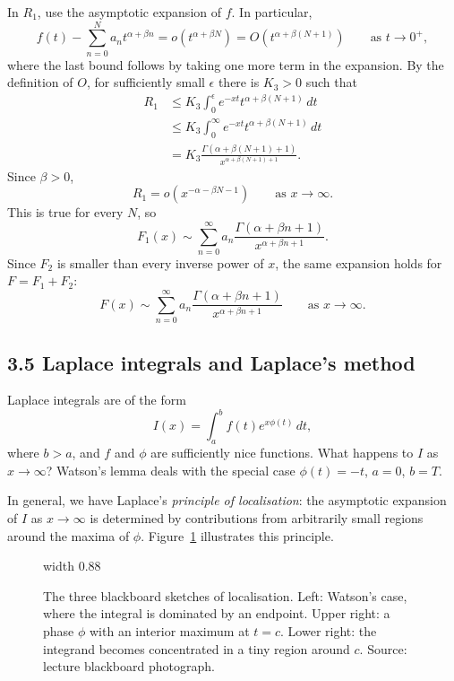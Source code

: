 In $R_1$, use the asymptotic expansion of $f$. In particular,
\[
    f(t)-\sum_{n=0}^N a_n t^{\alpha+\beta n}
    =o(t^{\alpha+\beta N})
    =O(t^{\alpha+\beta(N+1)})
    \qquad\text{as }t\to0^+,
\]
where the last bound follows by taking one more term in the expansion.
By the definition of $O$, for sufficiently small $\epsilon$ there is
$K_3>0$ such that
\begin{align*}
    R_1
    &\leq K_3\int_0^\epsilon e^{-xt}t^{\alpha+\beta(N+1)}\,dt\\
    &\leq K_3\int_0^\infty e^{-xt}t^{\alpha+\beta(N+1)}\,dt\\
    &=K_3\frac{\Gamma(\alpha+\beta(N+1)+1)}
    {x^{\alpha+\beta(N+1)+1}}.
\end{align*}
Since $\beta>0$,
\[
    R_1=o\!\left(x^{-\alpha-\beta N-1}\right)
    \qquad\text{as }x\to\infty.
\]
This is true for every $N$, so
\[
    F_1(x)\sim\sum_{n=0}^\infty
    a_n\frac{\Gamma(\alpha+\beta n+1)}{x^{\alpha+\beta n+1}}.
\]
Since $F_2$ is smaller than every inverse power of $x$, the same expansion
holds for $F=F_1+F_2$:
\[
    F(x)\sim\sum_{n=0}^\infty
    a_n\frac{\Gamma(\alpha+\beta n+1)}{x^{\alpha+\beta n+1}}
    \qquad\text{as }x\to\infty.
\]

\subsection*{3.5 Laplace integrals and Laplace's method}

Laplace integrals are of the form
\[
    I(x)=\int_a^b f(t)e^{x\phi(t)}\,dt,
\]
where $b>a$, and $f$ and $\phi$ are sufficiently nice functions.
What happens to $I$ as $x\to\infty$?
Watson's lemma deals with the special case $\phi(t)=-t$, $a=0$, $b=T$.

In general, we have Laplace's \emph{principle of localisation}:
the asymptotic expansion of $I$ as $x\to\infty$ is determined by
contributions from arbitrarily small regions around the maxima of $\phi$.
Figure~\ref{fig:am-lecture5-localisation} illustrates this principle.
\begin{figure}[htbp]
    \centering
    \pdfximage width 0.88\linewidth {figures/asymptotic-lecture5-localisation.jpg}
    \pdfrefximage\pdflastximage
    \caption{The three blackboard sketches of localisation. Left: Watson's
    case, where the integral is dominated by an endpoint. Upper right:
    a phase $\phi$ with an interior maximum at $t=c$. Lower right:
    the integrand becomes concentrated in a tiny region around $c$.
    Source: lecture blackboard photograph.}
    \label{fig:am-lecture5-localisation}
\end{figure}

